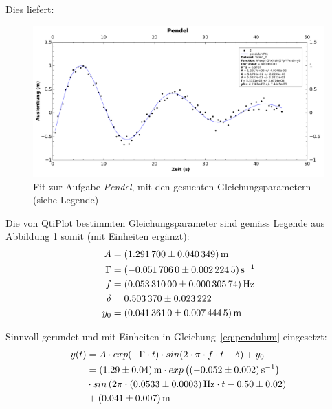 Dies liefert:

\begin{figure}[th!]
    \centering
    \includegraphics[width=\textwidth]{images/aufgabe4.pdf}
    \caption{Fit zur Aufgabe \emph{Pendel}, mit den gesuchten Gleichungsparametern (siehe Legende)}
    \label{fig:pendulum}
\end{figure}

Die  von  QtiPlot bestimmten  Gleichungsparameter  sind  gem\"ass Legende  aus
Abbildung \ref{fig:pendulum} somit (mit Einheiten erg\"anzt):
\begin{align*}
    A      & = \SI[separate-uncertainty  = true]{ 1.2917   \pm 0.040349}{\meter} \\
    \Gamma & = \SI[separate-uncertainty  = true]{-0.051706 \pm 0.0022245}{\per\second} \\
    f      & = \SI[separate-uncertainty  = true]{ 0.05331  \pm 0.00030574}{\hertz} \\
    \delta & = \num[separate-uncertainty = true]{ 0.50337  \pm 0.023222} \\
    y_0    & = \SI[separate-uncertainty  = true]{ 0.041361 \pm 0.0074445}{\meter}
\end{align*}

Sinnvoll gerundet und mit Einheiten in Gleichung~\ref{eq:pendulum} eingesetzt:
\begin{align*}
    y(t)   & = A \cdot exp(-\Gamma \cdot t) \cdot sin(2 \cdot \pi \cdot f \cdot t - \delta) + y_0 \\
           & =     \SI[separate-uncertainty = true]{1.29 \pm 0.04}{\meter}
           \cdot exp\left(\SI[separate-uncertainty = true]{-0.052 \pm 0.002}{\per\second}\right) \\
           & \cdot sin\left(2\pi \cdot \SI[separate-uncertainty = true]{0.0533 \pm 0.0003}{\hertz} \cdot t - \num[separate-uncertainty = true]{0.50 \pm 0.02}\right) \\
           & + \SI[separate-uncertainty = true]{0.041 \pm 0.007}{\meter}
\end{align*}


